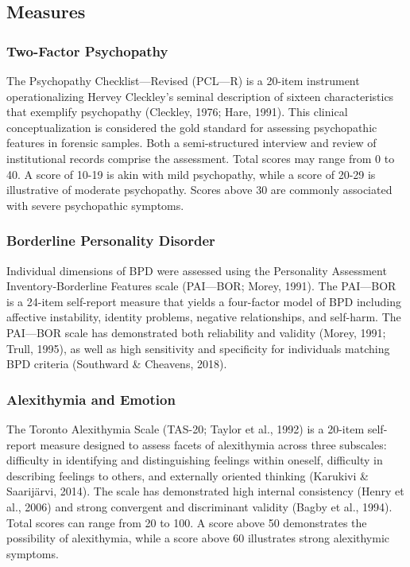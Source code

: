 \documentclass[
  man,floatsintext]{apa7}
\begin{document}
\hypertarget{measures}{%
\subsection{Measures}\label{measures}}

\hypertarget{two-factor-psychopathy}{%
\subsubsection{Two-Factor Psychopathy}\label{two-factor-psychopathy}}

The Psychopathy Checklist---Revised (PCL---R) is a 20-item instrument operationalizing Hervey Cleckley's seminal description of sixteen characteristics that exemplify psychopathy (Cleckley, 1976; Hare, 1991). This clinical conceptualization is considered the gold standard for assessing psychopathic features in forensic samples. Both a semi-structured interview and review of institutional records comprise the assessment. Total scores may range from 0 to 40. A score of 10-19 is akin with mild psychopathy, while a score of 20-29 is illustrative of moderate psychopathy. Scores above 30 are commonly associated with severe psychopathic symptoms.

\hypertarget{borderline-personality-disorder}{%
\subsubsection{Borderline Personality Disorder}\label{borderline-personality-disorder}}

Individual dimensions of BPD were assessed using the Personality Assessment Inventory-Borderline Features scale (PAI---BOR; Morey, 1991). The PAI---BOR is a 24-item self-report measure that yields a four-factor model of BPD including affective instability, identity problems, negative relationships, and self-harm. The PAI---BOR scale has demonstrated both reliability and validity (Morey, 1991; Trull, 1995), as well as high sensitivity and specificity for individuals matching BPD criteria (Southward \& Cheavens, 2018).

\hypertarget{alexithymia-and-emotion}{%
\subsubsection{Alexithymia and Emotion}\label{alexithymia-and-emotion}}

The Toronto Alexithymia Scale (TAS-20; Taylor et al., 1992) is a 20-item self-report measure designed to assess facets of alexithymia across three subscales: difficulty in identifying and distinguishing feelings within oneself, difficulty in describing feelings to others, and externally oriented thinking (Karukivi \& Saarijärvi, 2014). The scale has demonstrated high internal consistency (Henry et al., 2006) and strong convergent and discriminant validity (Bagby et al., 1994). Total scores can range from 20 to 100. A score above 50 demonstrates the possibility of alexithymia, while a score above 60 illustrates strong alexithymic symptoms.
\end{document}
